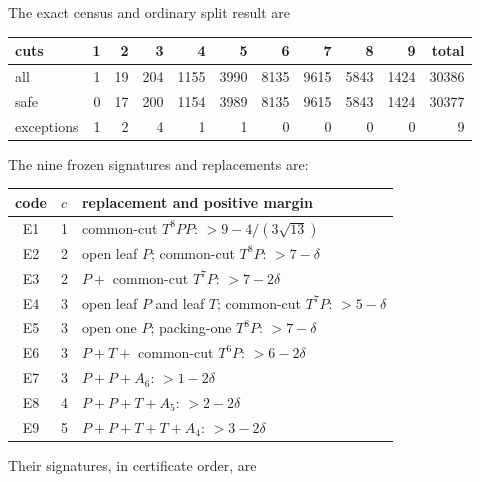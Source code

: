 \documentclass[11pt]{article}
\begin{document}
The exact census and ordinary split result are
\begin{center}
\begin{tabular}{lrrrrrrrrr|r}
\toprule
cuts&1&2&3&4&5&6&7&8&9&total\\
\midrule
all&1&19&204&1155&3990&8135&9615&5843&1424&30386\\
safe&0&17&200&1154&3989&8135&9615&5843&1424&30377\\
exceptions&1&2&4&1&1&0&0&0&0&9\\
\bottomrule
\end{tabular}
\end{center}
The nine frozen signatures and replacements are:
\begin{center}
\small
\begin{tabular}{cll}
\toprule
code&$c$&replacement and positive margin\\
\midrule
E1&1&common-cut $T^8PP$: $>9-4/(3\sqrt{13})$\\
E2&2&open leaf $P$; common-cut $T^8P$: $>7-\delta$\\
E3&2&$P+$ common-cut $T^7P$: $>7-2\delta$\\
E4&3&open leaf $P$ and leaf $T$; common-cut $T^7P$: $>5-\delta$\\
E5&3&open one $P$; packing-one $T^8P$: $>7-\delta$\\
E6&3&$P+T+$ common-cut $T^6P$: $>6-2\delta$\\
E7&3&$P+P+A_6$: $>1-2\delta$\\
E8&4&$P+P+T+A_5$: $>2-2\delta$\\
E9&5&$P+P+T+T+A_4$: $>3-2\delta$\\
\bottomrule
\end{tabular}
\end{center}
Their signatures, in certificate order, are
\begin{description}
\small
\item[E1] 
\item[E2] 
\item[E3] 
\item[E4] 
\item[E5] 
\item[E6] 
\item[E7] 
\item[E8] 
\item[E9] 
\end{description}
\end{document}
